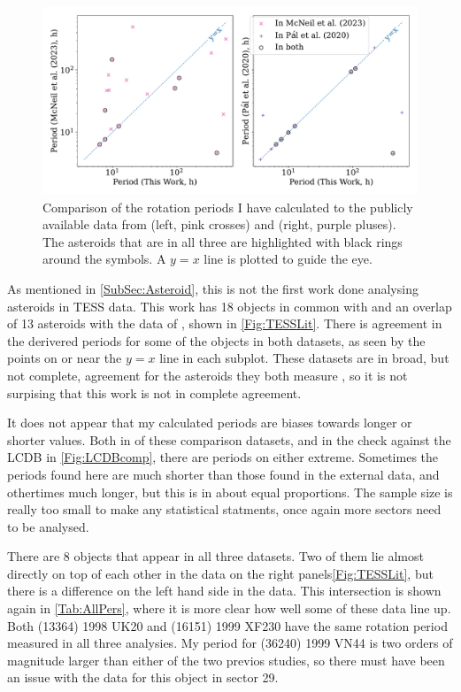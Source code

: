 \documentclass{UCreport}
\begin{document}
\begin{figure}[!t]
  \centering
  \includegraphics[width=\textwidth]{./Figures/M23andP20Comp.pdf}
  \caption[Comparison to TESS periods from the Literature]{Comparison of the rotation periods I have calculated to the publicly available data from \citet{McNeill2023} (left, pink crosses) and \citet{Pal2020} (right, purple pluses). The asteroids that are in all three are highlighted with black rings around the symbols.
    A $y=x$ line is plotted to guide the eye.}
  \label{Fig:TESSLit}
\end{figure}

As mentioned in \autoref{SubSec:Asteroid}, this is not the first work done analysing asteroids in TESS data.
This work has 18 objects in common with \citet{McNeill2023} and an overlap of 13 asteroids with the data of \citet{Pal2020}, shown in \autoref{Fig:TESSLit}.
There is agreement in the derivered periods for some of the objects in both datasets, as seen by the points on or near the $y=x$ line in each subplot.
These datasets are in broad, but not complete, agreement for the asteroids they both measure \citep[see the comparison in ][]{McNeill2023}, so it is not surpising that this work is not in complete agreement.

It does not appear that my calculated periods are biases towards longer or shorter values.
Both in of these comparison datasets, and in the check against the LCDB in \autoref{Fig:LCDBcomp}, there are periods on either extreme.
Sometimes the periods found here are much shorter than those found in the external data, and othertimes much longer, but this is in about equal proportions.
The sample size is really too small to make any statistical statments, once again more sectors need to be analysed.

There are 8 objects that appear in all three datasets.
Two of them lie almost directly on top of each other in the \citeauthor{Pal2020} data on the right panels\autoref{Fig:TESSLit}, but there is a difference on the left hand side in the \citeauthor{McNeill2023} data.
This intersection is shown again in \autoref{Tab:AllPers}, where it is more clear how well some of these data line up.
Both (13364) 1998 UK20 and (16151) 1999 XF230 have the same rotation period measured in all three analysies.
My period for (36240) 1999 VN44 is two orders of magnitude larger than either of the two previos studies, so there must have been an issue with the data for this object in sector 29.
\end{document}
